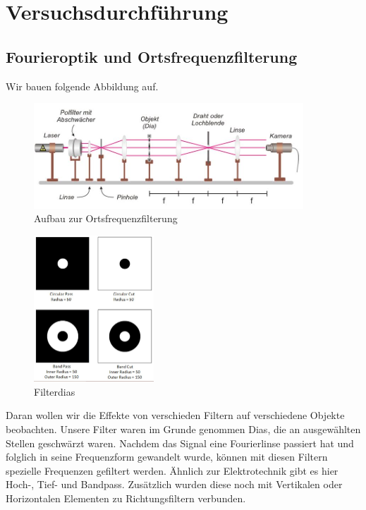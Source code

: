 \chapter{Versuchsdurchführung}
    \section{Fourieroptik und Ortsfrequenzfilterung}
Wir bauen folgende Abbildung auf.

\begin{figure}[H]
    \centering
    \includegraphics[width=0.9\textwidth]{Abb/Abb_1.jpg}
    \caption{Aufbau zur Ortsfrequenzfilterung}
\end{figure}

            \begin{figure}
                \vspace{10pt}
                \centering
                \includegraphics[width=0.4\textwidth]{Abb/Abb_2.jpg}
                \caption{Filterdias}
                \vspace{10pt}
            \end{figure}

Daran wollen wir die Effekte von verschieden Filtern auf verschiedene Objekte beobachten.
Unsere Filter waren im Grunde genommen Dias, die an ausgewählten Stellen geschwärzt waren.
Nachdem das Signal eine Fourierlinse passiert hat und folglich in seine Frequenzform gewandelt wurde, können mit diesen Filtern spezielle Frequenzen gefiltert werden.
Ähnlich zur Elektrotechnik gibt es hier Hoch-, Tief- und Bandpass. 
Zusätzlich wurden diese noch mit Vertikalen oder Horizontalen Elementen zu Richtungsfiltern verbunden.

